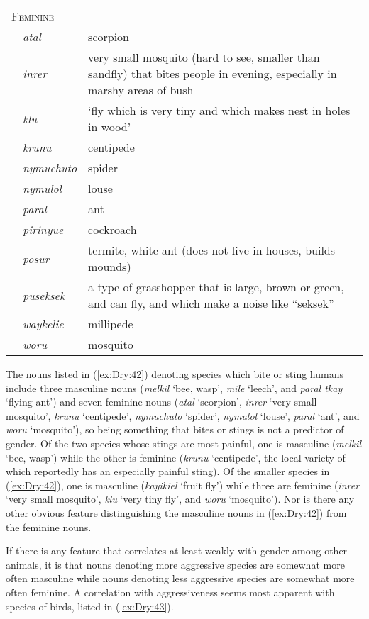 \documentclass[output=collectionpaper]{langsci/langscibook}
\begin{document}
\begin{tabularx}{0.9\textwidth}{lp{1.8cm}X}
\multicolumn{3}{l}{\textsc{Feminine}}\\
& \textit{atal} & scorpion\\
& \textit{inrer} & very small mosquito (hard to see, smaller than sandfly) that bites people in evening, especially in marshy areas of bush\\
& \textit{klu} & `fly which is very tiny and which makes nest in holes in wood'\\
& \textit{krunu} & centipede\\
& \textit{nymuchuto} & spider\\
& \textit{nymulol} & louse\\
& \textit{paral} & ant\\
& \textit{pirinyue} & cockroach\\
& \textit{posur} & termite, white ant (does not live in houses, builds mounds)\\
& \textit{puseksek} & a type of grasshopper that is large, brown or green, and can fly, and which make a noise like ``seksek''\\
& \textit{waykelie} & millipede\\
& \textit{woru} & mosquito\\
\end{tabularx}
\z

The nouns listed in (\ref{ex:Dry:42}) denoting species which bite or sting humans include three masculine nouns (\textit{melkil} `bee, wasp', \textit{mile} `leech', and \textit{paral tkay} `flying ant') and seven feminine nouns (\textit{atal} `scorpion', \textit{inrer} `very small mosquito', \textit{krunu} `centipede', \textit{nymuchuto} `spider', \textit{nymulol} `louse', \textit{paral} `ant', and \textit{woru} `mosquito'), so being something that bites or stings is not a predictor of gender. Of the two species whose stings are most painful, one is masculine (\textit{melkil} `bee, wasp') while the other is feminine (\textit{krunu} `centipede', the local variety of which reportedly has an especially painful sting). Of the smaller species in (\ref{ex:Dry:42}), one is masculine (\textit{kayikiel} `fruit fly') while three are feminine (\textit{inrer} `very small mosquito', \textit{klu} `very tiny fly', and \textit{woru} `mosquito'). Nor is there any other obvious feature distinguishing the masculine nouns in (\ref{ex:Dry:42}) from the feminine nouns.

If there is any feature that correlates at least weakly with gender among other  animals, it is that nouns denoting more aggressive species are somewhat more often masculine while nouns denoting less aggressive species are somewhat more often feminine. A correlation with aggressiveness seems most apparent with species of birds, listed in (\ref{ex:Dry:43}).
\end{document}
